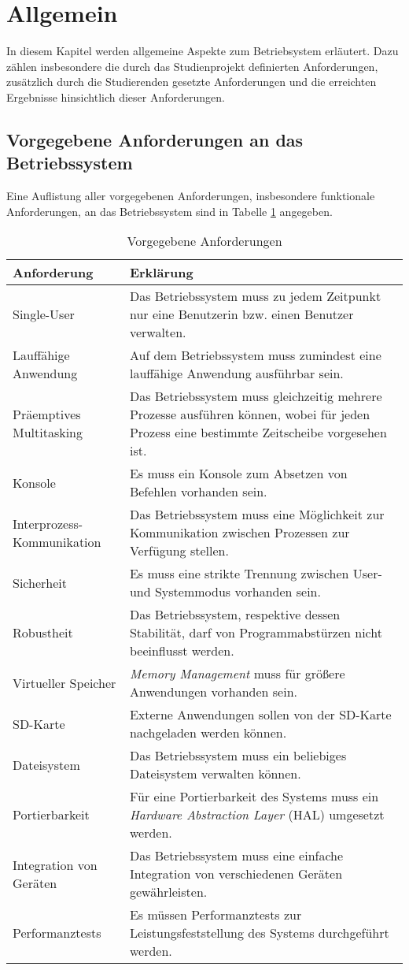 \section{Allgemein}
In diesem Kapitel werden allgemeine Aspekte zum Betriebsystem erläutert. Dazu zählen insbesondere die durch das Studienprojekt definierten Anforderungen, zusätzlich durch die Studierenden gesetzte Anforderungen und die erreichten Ergebnisse hinsichtlich dieser Anforderungen.

\subsection{Vorgegebene Anforderungen an das Betriebssystem}
Eine Auflistung aller vorgegebenen Anforderungen, insbesondere funktionale Anforderungen, an das Betriebssystem sind in Tabelle \ref{table:Prescribed-Requirements} angegeben.

\begin{table}[H]
\begin{tabular}{ p{5cm}| p{9cm} }
  \textbf{Anforderung} & \textbf{Erklärung} \\ 
  \hline
  Single-User & Das Betriebssystem muss zu jedem Zeitpunkt nur eine Benutzerin bzw. einen Benutzer verwalten. \\
  Lauffähige Anwendung & Auf dem Betriebssystem muss zumindest eine lauffähige Anwendung ausführbar sein. \\
  Präemptives Multitasking & Das Betriebssystem muss gleichzeitig mehrere Prozesse ausführen können, wobei für jeden Prozess eine bestimmte Zeitscheibe vorgesehen ist.\\
  Konsole & Es muss ein Konsole zum Absetzen von Befehlen vorhanden sein. \\
  Interprozess-Kommunikation & Das Betriebssystem muss eine Möglichkeit zur Kommunikation zwischen Prozessen zur Verfügung stellen. \\
  Sicherheit & Es muss eine strikte Trennung zwischen User- und Systemmodus vorhanden sein. \\
  Robustheit & Das Betriebssystem, respektive dessen Stabilität, darf von Programmabstürzen nicht beeinflusst werden. \\
  Virtueller Speicher & \textit{Memory Management} muss für größere Anwendungen vorhanden sein. \\
  SD-Karte & Externe Anwendungen sollen von der SD-Karte nachgeladen werden können. \\
  Dateisystem & Das Betriebssystem muss ein beliebiges Dateisystem verwalten können.\\
  Portierbarkeit & Für eine Portierbarkeit des Systems muss ein \textit{Hardware Abstraction Layer} (HAL) umgesetzt werden. \\
  Integration von Geräten & Das Betriebssystem muss eine einfache Integration von verschiedenen Geräten gewährleisten. \\
  Performanztests & Es müssen Performanztests zur Leistungsfeststellung des Systems durchgeführt werden. \\  
 \end{tabular}
 \caption{Vorgegebene Anforderungen}
 \label{table:Prescribed-Requirements}
\end{table}

